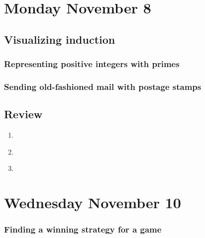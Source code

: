 

\section*{Monday November 8}
\subsection*{Visualizing induction}



\newpage


\subsubsection*{Representing positive integers with primes}

\subsubsection*{Sending old-fashioned mail with postage stamps}

\newpage
\subsection*{Review}
\begin{enumerate}
    \item \hspace{1in} \\ 
    \item \hspace{1in}\\ 
    \newpage
    \item 
\end{enumerate}

\newpage
\section*{Wednesday November 10}

\subsubsection*{Finding a winning strategy for a game}

\newpage

